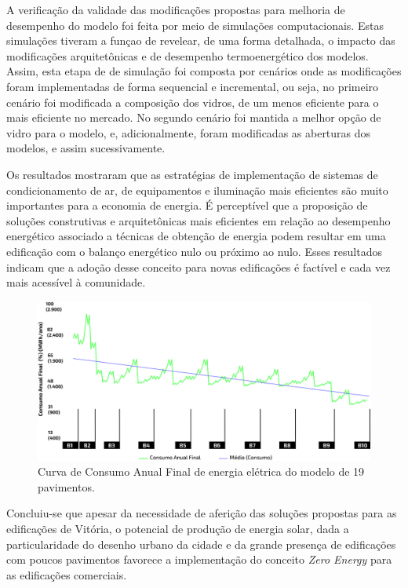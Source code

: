 \begin{onehalfspace}
    \noindent A verificação da validade das modificações propostas para melhoria de 
    desempenho do modelo foi feita por meio de simulações computacionais. Estas simulações
    tiveram a funçao de revelear, de uma forma detalhada, o impacto das modificações 
    arquitetônicas e de desempenho termoenergético dos modelos. Assim, esta etapa de 
    de simulação foi composta por cenários onde as modificações foram implementadas 
    de forma sequencial e incremental, ou seja, no primeiro cenário foi 
    modificada a composição dos vidros, de um menos eficiente para o mais eficiente 
    no mercado. No segundo cenário foi mantida a melhor opção de vidro para o modelo, e,
    adicionalmente, foram modificadas as aberturas dos modelos, e assim sucessivamente.\vspace*{0.3cm}

    \noindent Os resultados mostraram que as estratégias de implementação de sistemas
    de condicionamento de ar, de equipamentos e iluminação mais eficientes são muito importantes
    para a economia de energia. É perceptível que a proposição de soluções construtivas e
    arquitetônicas mais eficientes em relação ao desempenho energético associado a técnicas de
    obtenção de energia podem resultar em uma edificação com o balanço energético nulo ou
    próximo ao nulo. Esses resultados indicam que a adoção desse conceito para novas edificações é
    factível e cada vez mais acessível à comunidade.\vspace*{0.3cm}
    \begin{figure}[H]
        \label{fig:4}
        \centering
        \includegraphics[width=1\textwidth]{figures/grafico-8pav.png}
        \caption{Curva de Consumo Anual Final de energia elétrica do modelo de 19 pavimentos.}
    \end{figure}

    \noindent Concluiu-se que apesar da necessidade de aferição das soluções propostas para 
    as edificações de Vitória, o potencial de produção de energia solar, dada a particularidade
    do desenho urbano da cidade e da grande presença de edificações com poucos pavimentos favorece
    a implementação do conceito \textit{Zero Energy} para as edificações comerciais.
\end{onehalfspace}
